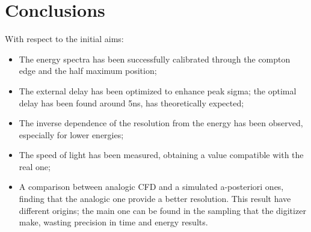 \documentclass[11pt,a4 paper]{article}
\begin{document}
\section{Conclusions}
With respect to the initial aims:
\begin{itemize}[noitemsep]
    \item The energy spectra has been successfully calibrated through the compton edge and the half maximum position;
    \item The external delay has been optimized to enhance peak sigma; the optimal delay has been found around 5ns, has theoretically expected;
    \item The inverse dependence of the resolution from the energy has been observed, especially for lower energies;
    \item The speed of light has been measured, obtaining a value compatible with the real one;
    \item A comparison between analogic CFD and a simulated a-posteriori ones, finding that the analogic one provide a better resolution. This result have different origins; the main one can be found in the sampling that the digitizer make, wasting precision in time and energy results.
\end{itemize}
\end{document}
